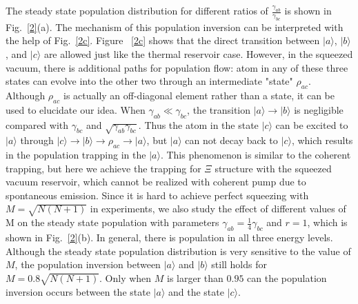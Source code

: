 \documentclass[aps,showpacs,twocolumn,twoside,groupedaddress]{revtex4}
\begin{document}
The steady state population distribution for different ratios of $\frac{\gamma_{ab}}{\gamma_{bc}}$ is shown in Fig.~\ref{2}(a). The mechanism of this population inversion can be interpreted with the help of Fig.~\ref{2c}. Figure ~\ref{2c} shows that the direct transition between $|a\rangle$, $|b\rangle$, and $|c\rangle$ are allowed just like the thermal reservoir case. However, in the squeezed vacuum, there is additional paths for population flow: atom in any of these three states can evolve into the other two through an intermediate "state" $\rho_{ac}$. Although $\rho_{ac}$ is actually an off-diagonal element rather than a state, it can be used to elucidate our idea. When $\gamma_{ab}\ll\gamma_{bc}$, the transition $|a\rangle\rightarrow|b\rangle$ is negligible compared with $\gamma_{bc}$ and $\sqrt{\gamma_{ab}\gamma_{bc}}$. Thus the atom in the state $|c\rangle$ can be excited to $|a\rangle$ through $|c\rangle\rightarrow|b\rangle\rightarrow\rho_{ac}\rightarrow|a\rangle$, but $|a\rangle$ can not decay back to $|c\rangle$, which results in the population trapping in the $|a\rangle$. This phenomenon is similar to the coherent trapping, but here we achieve the trapping for $\Xi$ structure with the squeezed vacuum reservoir, which cannot be realized with coherent pump due to spontaneous emission. Since it is hard to achieve perfect squeezing with $M=\sqrt{N(N+1)}$ in experiments, we also study the effect of different values of M on the steady state population with parameters $\gamma_{ab}=\frac{1}{4}\gamma_{bc}$ and $r=1$, which is shown in Fig.~\ref{2}(b). In general, there is population in all three energy levels. Although the steady state population distribution is very sensitive to the value of $M$, the population inversion between $|a\rangle$ and $|b\rangle$ still holds for $M=0.8\sqrt{N(N+1)}$. Only when $M$ is larger than $0.95$ can the population inversion occurs between the state $|a\rangle$ and the state $|c\rangle$.
\end{document}
